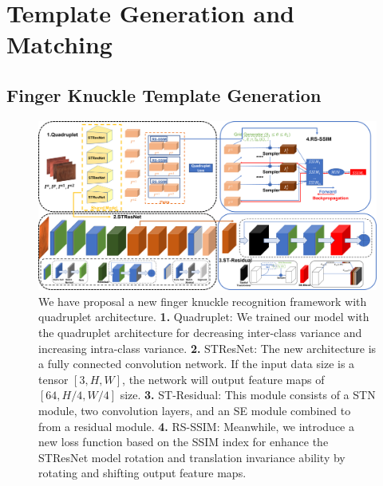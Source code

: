 \section{Template Generation and Matching\label{template-generation}}

\subsection{Finger Knuckle Template Generation\label{fk-template}}

\begin{figure}
    \centering
    \includegraphics[width=5in]{Figures/framework/ST-Residual/Framework.png}
    \caption{We have proposal a new finger knuckle recognition framework with quadruplet architecture. \textbf{1.} Quadruplet: We trained our model with the quadruplet architecture \cite{chen2017beyond} for decreasing inter-class variance and increasing intra-class variance. \textbf{2.} STResNet: The new architecture is a fully connected convolution network. If the input data size is a tensor $[3, H, W]$, the network will output feature maps of $[64, H/4, W/4]$ size. \textbf{3.} ST-Residual: This module consists of a STN \cite{jaderberg2015spatial} module, two convolution layers, and an SE \cite{hu2018squeeze} module combined to from a residual module.
     \textbf{4.} RS-SSIM: Meanwhile, we introduce a new loss function based on the SSIM index for enhance the STResNet model rotation and translation invariance ability by rotating and shifting output feature maps.}
    \label{framework}
\end{figure}

